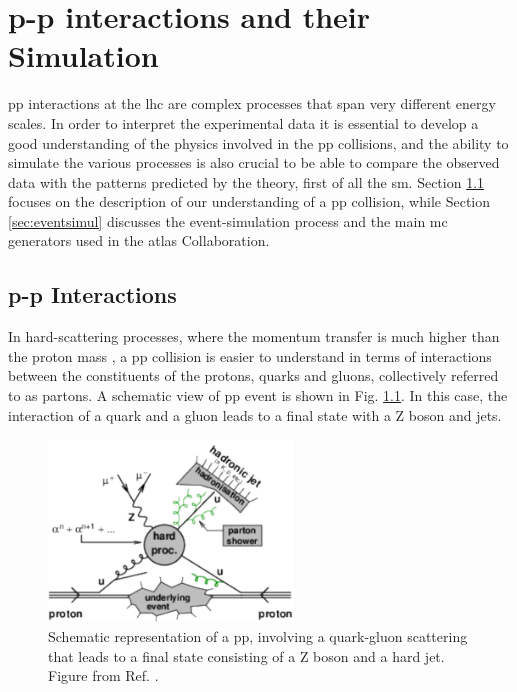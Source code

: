 \chapter{p-p interactions and their Simulation}
\label{chap:event:MC}

\Gls{pp} interactions at the \gls{lhc} are complex processes that span very different energy scales. 
In order to interpret the experimental data it is essential to develop a good understanding of the physics involved in the \gls{pp} collisions, and the ability to simulate the various processes is also crucial to be able to compare the observed data with the patterns predicted by the theory, first of all the \gls{sm}.
Section \ref{sec:ppint} focuses on the description of our understanding of a \gls{pp} collision, while Section \ref{sec:eventsimul} 
discusses the event-simulation process and the main \gls{mc} generators used in the \gls{atlas} Collaboration. 



\section{p-p Interactions}
\label{sec:ppint}

In hard-scattering processes, where the momentum transfer is much higher than the proton mass \cite{Butterworth:2012fj}, 
a \gls{pp} collision is easier to understand in terms of interactions between the constituents of the protons, quarks and gluons, 
collectively referred to as partons. A schematic view of \gls{pp} event is shown in Fig. \ref{fig:sim:pp2}. In this case, the interaction of a quark and a gluon leads to a final state with a Z boson and jets. 

\begin{figure}[h]
\begin{center}
    \includegraphics[width=0.58\textwidth]{figures/simul/ppcoll2}
\end{center}
 \caption{Schematic representation of a \gls{pp}, involving a quark-gluon scattering that leads to a final state consisting of a Z boson and a hard jet. Figure from Ref. \cite{Butterworth:2012fj}.}
  \label{fig:sim:pp2}
\end{figure}

